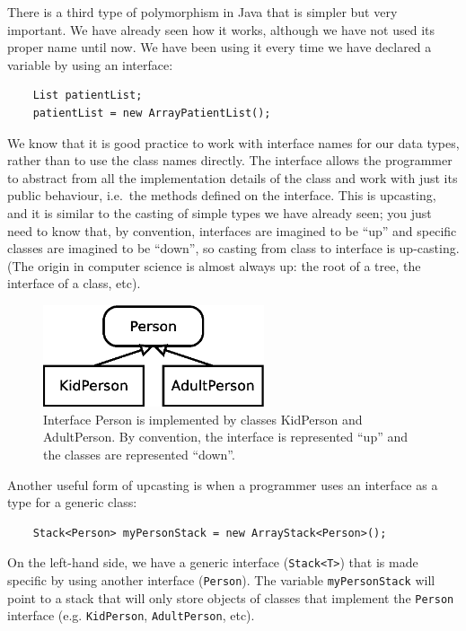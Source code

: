 There is a third type of
polymorphism in Java that is simpler but very important. We have
already seen how it works, although we have not used its proper name
until now.
We have been using it every time we have declared
a variable by using an interface: 

\begin{verbatim}
    List patientList;
    patientList = new ArrayPatientList();
\end{verbatim}

We know that it is good practice to work with interface names for our
data types, rather than to use the class names directly. The interface
allows the programmer to abstract from all the implementation details
of the class and work with just its public behaviour, i.e.~the methods
defined on the interface. This is upcasting, and it is similar to the
casting of simple types we have already seen; you just need to know
that, by convention, interfaces are imagined to be ``up'' and specific
classes are imagined to be ``down'', so casting from class to
interface is up-casting. (The origin in computer science is almost
always up: the root of a tree, the interface of a class, etc). 

\begin{figure}[hbtp]
  \centering
  \includegraphics[height=3cm]{gfx/class_diagram-person}
  \caption{Interface Person is implemented by classes KidPerson and
    AdultPerson. By convention, the interface is represented ``up'' and
    the classes are represented ``down''.} 
  \label{fig:updown}
\end{figure}

Another useful form of upcasting is when a programmer uses an
interface as a type for a generic class: 

\begin{verbatim}
    Stack<Person> myPersonStack = new ArrayStack<Person>();
\end{verbatim}

On the left-hand side, we have a generic interface (\verb+Stack<T>+) that is made
specific by using another interface (\verb+Person+). The variable
\verb+myPersonStack+ will point to a stack that will only store
objects of classes that implement the \verb+Person+ interface
(e.g. \verb+KidPerson+, \verb+AdultPerson+, etc). 

